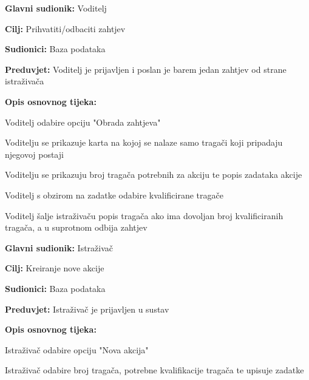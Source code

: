 					\noindent {}
					\begin{packed_item}
						
						\item \textbf{Glavni sudionik: } Voditelj
						\item  \textbf{Cilj:} Prihvatiti/odbaciti zahtjev
						\item  \textbf{Sudionici:} Baza podataka
						\item  \textbf{Preduvjet:} Voditelj je prijavljen i poslan je barem jedan zahtjev od strane istraživača
						\item  \textbf{Opis osnovnog tijeka:}
						
						\item[] \begin{packed_enum}						
							\item Voditelj odabire opciju "Obrada zahtjeva"
							\item Voditelju se prikazuje karta na kojoj se nalaze samo tragači koji pripadaju njegovoj postaji
							\item Voditelju se prikazuju broj tragača potrebnih za akciju te popis zadataka akcije
							\item Voditelj s obzirom na zadatke odabire kvalificirane tragače  
							\item Voditelj šalje istraživaču popis tragača ako ima dovoljan broj kvalificiranih tragača, a u suprotnom odbija zahtjev
						\end{packed_enum}
					\end{packed_item}
					
					\noindent \underbar{\textbf{UC19 - Kreiranje akcije}}
					\begin{packed_item}
						
						\item \textbf{Glavni sudionik: } Istraživač
						\item  \textbf{Cilj:} Kreiranje nove akcije
						\item  \textbf{Sudionici:} Baza podataka
						\item  \textbf{Preduvjet:} Istraživač je prijavljen u sustav
						\item  \textbf{Opis osnovnog tijeka:}
						
						\item[] \begin{packed_enum}
							
							\item Istraživač odabire opciju "Nova akcija"
							\item Istraživač odabire broj tragača, potrebne kvalifikacije tragača te upisuje zadatke
						\end{packed_enum}
					\end{packed_item}
					
